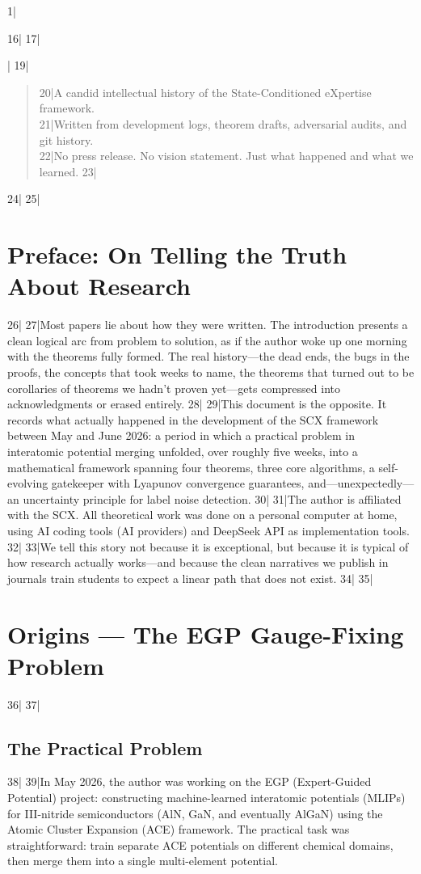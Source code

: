 1|\documentclass[12pt,a4paper]{article}
\begin{document}
16|
17||
19|\begin{quote}
20|A candid intellectual history of the State-Conditioned eXpertise framework.\\
21|Written from development logs, theorem drafts, adversarial audits, and git history.\\
22|No press release. No vision statement. Just what happened and what we learned.
23|\end{quote}
24|
25|\section*{Preface: On Telling the Truth About Research}
26|
27|Most papers lie about how they were written. The introduction presents a clean logical arc from problem to solution, as if the author woke up one morning with the theorems fully formed. The real history—the dead ends, the bugs in the proofs, the concepts that took weeks to name, the theorems that turned out to be corollaries of theorems we hadn't proven yet—gets compressed into acknowledgments or erased entirely.
28|
29|This document is the opposite. It records what actually happened in the development of the SCX framework between May and June 2026: a period in which a practical problem in interatomic potential merging unfolded, over roughly five weeks, into a mathematical framework spanning four theorems, three core algorithms, a self-evolving gatekeeper with Lyapunov convergence guarantees, and—unexpectedly—an uncertainty principle for label noise detection.
30|
31|The author is affiliated with the SCX. All theoretical work was done on a personal computer at home, using AI coding tools (AI providers) and DeepSeek API as implementation tools.
32|
33|We tell this story not because it is exceptional, but because it is typical of how research actually works—and because the clean narratives we publish in journals train students to expect a linear path that does not exist.
34|
35|\section{Origins — The EGP Gauge-Fixing Problem}
36|
37|\subsection{The Practical Problem}
38|
39|In May 2026, the author was working on the EGP (Expert-Guided Potential) project: constructing machine-learned interatomic potentials (MLIPs) for III-nitride semiconductors (AlN, GaN, and eventually AlGaN) using the Atomic Cluster Expansion (ACE) framework. The practical task was straightforward: train separate ACE potentials on different chemical domains, then merge them into a single multi-element potential.
\end{document}
